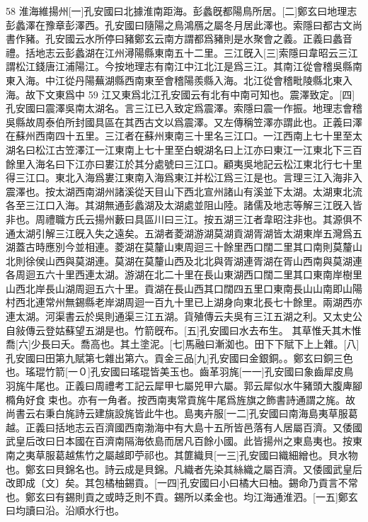 58
淮海維揚州[一]孔安國曰北據淮南距海。彭蠡旣都陽鳥所居。[二]鄭玄曰地理志彭蠡澤在豫章彭澤西。孔安國曰隨陽之鳥鴻鴈之屬冬月居此澤也。索隱曰都古文尚書作豬。孔安國云水所停曰豬鄭玄云南方謂都爲豬則是水聚會之義。正義曰蠡音禮。括地志云彭蠡湖在江州潯陽縣東南五十二里。三江旣入[三]索隱曰韋昭云三江謂松江錢唐江浦陽江。今按地理志有南江中江北江是爲三江。其南江從會稽吳縣南東入海。中江從丹陽蕪湖縣西南東至會稽陽羨縣入海。北江從會稽毗陵縣北東入海。故下文東爲中
59
江又東爲北江孔安國云有北有中南可知也。震澤致定。[四]孔安國曰震澤吳南太湖名。言三江已入致定爲震澤。索隱曰震一作振。地理志會稽吳縣故周泰伯所封國具區在其西古文以爲震澤。又左傳稱笠澤亦謂此也。正義曰澤在蘇州西南四十五里。三江者在蘇州東南三十里名三江口。一江西南上七十里至太湖名曰松江古笠澤江一江東南上七十里至白蜆湖名曰上江亦曰東江一江東北下三百餘里入海名曰下江亦曰婁江於其分處號曰三江口。顧夷吳地記云松江東北行七十里得三江口。東北入海爲婁江東南入海爲東江并松江爲三江是也。言理三江入海非入震澤也。按太湖西南湖州諸溪從天目山下西北宣州諸山有溪並下太湖。太湖東北流各至三江口入海。其湖無通彭蠡湖及太湖處並阻山陸。諸儒及地志等解三江旣入皆非也。周禮職方氏云揚州藪曰具區川曰三江。按五湖三江者韋昭注非也。其源俱不通太湖引解三江旣入失之遠矣。五湖者菱湖游湖莫湖貢湖胥湖皆太湖東岸五灣爲五湖蓋古時應別今並相連。菱湖在莫釐山東周迴三十餘里西口闊二里其口南則莫釐山北則徐侯山西與莫湖連。莫湖在莫釐山西及北北與胥湖連胥湖在胥山西南與莫湖連各周迴五六十里西連太湖。游湖在北二十里在長山東湖西口闊二里其口東南岸樹里山西北岸長山湖周迴五六十里。貢湖在長山西其口闊四五里口東南長山山南即山陽村西北連常州無錫縣老岸湖周迴一百九十里已上湖身向東北長七十餘里。兩湖西亦連太湖。河渠書云於吳則通渠三江五湖。貨殖傳云夫吳有三江五湖之利。又太史公自敍傳云登姑蘇望五湖是也。竹箭旣布。[五]孔安國曰水去布生。 其草惟夭其木惟喬[六]少長曰夭。喬高也。其土塗泥。[七]馬融曰漸洳也。田下下賦下上上雜。[八]孔安國曰田第九賦第七雜出第六。貢金三品[九]孔安國曰金銀銅。。鄭玄曰銅三色也。瑤琨竹箭[一０]孔安國曰瑤琨皆美玉也。齒革羽旄[一一]孔安國曰象齒犀皮鳥羽旄牛尾也。正義曰周禮考工記云犀甲七屬兕甲六屬。郭云犀似水牛豬頭大腹庳腳橢角好食束也。亦有一角者。按西南夷常貢旄牛尾爲旌旗之飾書詩通謂之旄。故尚書云右秉白旄詩云建旐設旄皆此牛也。島夷卉服[一二]孔安國曰南海島夷草服葛越。正義曰括地志云百濟國西南渤海中有大島十五所皆邑落有人居屬百濟。又倭國武皇后改曰日本國在百濟南隔海依島而居凡百餘小國。此皆揚州之東島夷也。按東南之夷草服葛越焦竹之屬越即苧祁也。其篚織貝[一三]孔安國曰織細繒也。貝水物也。鄭玄曰貝錦名也。詩云成是貝錦。凡織者先染其絲織之屬百濟。又倭國武皇后改即成〔文〕矣。其包橘柚錫貢。[一四]孔安國曰小曰橘大曰柚。錫命乃貢言不常也。鄭玄曰有錫則貢之或時乏則不貢。錫所以柔金也。均江海通淮泗。[一五]鄭玄曰均讀曰沿。沿順水行也。
